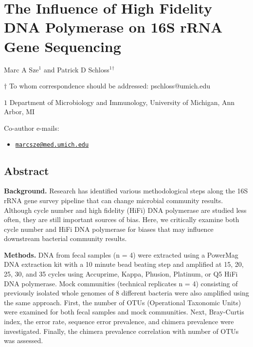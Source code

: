\documentclass[12pt,]{article}
\title{}
\author{}
\date{}
\providecommand{\tightlist}{%
  \setlength{\itemsep}{0pt}\setlength{\parskip}{0pt}}
\begin{document}
\section{The Influence of High Fidelity DNA Polymerase on 16S rRNA Gene
Sequencing}\label{the-influence-of-high-fidelity-dna-polymerase-on-16s-rrna-gene-sequencing}

\begin{center}
\vspace{25mm}

Marc A Sze${^1}$ and Patrick D Schloss${^1}$${^\dagger}$

\vspace{20mm}

$\dagger$ To whom correspondence should be addressed: pschloss@umich.edu

$1$ Department of Microbiology and Immunology, University of Michigan, Ann Arbor, MI




\end{center}

Co-author e-mails:

\begin{itemize}
\tightlist
\item
  \href{mailto:marcsze@med.umich.edu}{\nolinkurl{marcsze@med.umich.edu}}
\end{itemize}

\newpage

\linenumbers

\subsection{Abstract}\label{abstract}

\textbf{Background.} Research has identified various methodological
steps along the 16S rRNA gene survey pipeline that can change microbial
community results. Although cycle number and high fidelity (HiFi) DNA
polymerase are studied less often, they are still important sources of
bias. Here, we critically examine both cycle number and HiFi DNA
polymerase for biases that may influence downstream bacterial community
results.

\textbf{Methods.} DNA from fecal samples (n = 4) were extracted using a
PowerMag DNA extraction kit with a 10 minute bead beating step and
amplified at 15, 20, 25, 30, and 35 cycles using Accuprime, Kappa,
Phusion, Platinum, or Q5 HiFi DNA polymerase. Mock communities
(technical replicates n = 4) consisting of previously isolated whole
genomes of 8 different bacteria were also amplified using the same
approach. First, the number of OTUs (Operational Taxonomic Units) were
examined for both fecal samples and mock communities. Next, Bray-Curtis
index, the error rate, sequence error prevalence, and chimera prevalence
were investigated. Finally, the chimera prevalence correlation with
number of OTUs was assessed.
\end{document}
